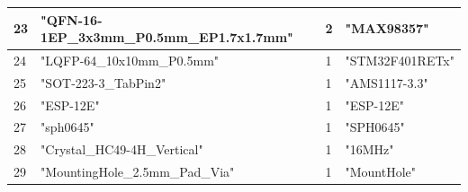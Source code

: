 \documentclass[12pt,a4paper,landscape]{article}
\begin{document}
\begin{center}
{\begin{tabular}{|l|l|l|l|}
				23&"QFN-16-1EP\_3x3mm\_P0.5mm\_EP1.7x1.7mm"&2&"MAX98357"\\ \hline
				24&"LQFP-64\_10x10mm\_P0.5mm"&1&"STM32F401RETx"\\ \hline
				25&"SOT-223-3\_TabPin2"&1&"AMS1117-3.3"\\ \hline
				26&"ESP-12E"&1&"ESP-12E"\\ \hline
				27&"sph0645"&1&"SPH0645"\\ \hline
				28&"Crystal\_HC49-4H\_Vertical"&1&"16MHz"\\ \hline
				29&"MountingHole\_2.5mm\_Pad\_Via"&1&"MountHole"\\ \hline
			\end{tabular}
}
	\end{center}
	
\end{document}
